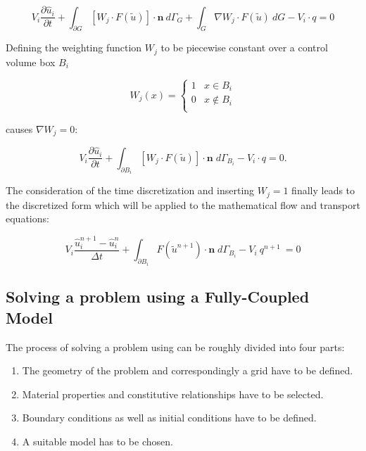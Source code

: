 \begin{equation}
	V_i \frac{\partial \hat u_i}{\partial t} + \int_{\partial G}  \left[ W_j \cdot F(\tilde u)\right]  \cdot \mathbf n \: d\varGamma_G + \int_G  \nabla W_j \cdot F(\tilde u)  \: dG- V_i \cdot q = 0
\end{equation}

Defining the weighting function $W_j$ to be piecewise constant over a control volume box $B_i$ 

\begin{equation}
	W_j(x) = \begin{cases}
	          1 &x \in B_i \\
		  0 &x \notin B_i\\
	         \end{cases}
\end{equation}

causes $\nabla W_j = 0$:

\begin{equation}
\label{eq:disc1} 
	V_i \frac{\partial \hat u_i}{\partial t} + \int_{\partial B_i}  \left[ W_j \cdot F(\tilde u)\right] \cdot \mathbf n  \;  d{\varGamma}_{B_i} - V_i \cdot q = 0 .
\end{equation}

The consideration of the time discretization and inserting $W_j = 1$ finally leads to the discretized form which will be applied to the mathematical flow and transport equations:

\begin{equation}
\label{eq:discfin} 
	V_i \frac{\hat u_i^{n+1} - \hat u_i^{n}}{\Delta t} + \int_{\partial B_i}  F(\tilde u^{n+1}) \cdot \mathbf n  \;  d{\varGamma}_{B_i} - V_i \: q^{n+1} \: = 0 
\end{equation}

\subsection[Fully-coupled model]{Solving a problem using a Fully-Coupled Model}\label{tutorial-coupled}

The process of solving a problem using \Dumux can be roughly divided into four parts:
\begin{enumerate}
 \item The geometry of the problem and correspondingly a grid have to be defined.
 \item Material properties and constitutive relationships have to be selected.
 \item Boundary conditions as well as initial conditions have to be defined.
 \item A suitable model has to be chosen.
\end{enumerate}


